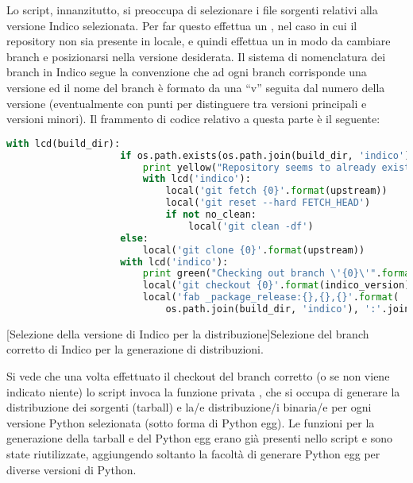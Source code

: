         Lo script, innanzitutto, si preoccupa di selezionare i file sorgenti relativi alla versione Indico selezionata. Per far questo effettua un , nel caso in cui il repository non sia presente in locale, e quindi effettua un  in modo da cambiare branch e posizionarsi nella versione desiderata. Il sistema di nomenclatura dei branch in Indico segue la convenzione che ad ogni branch corrisponde una versione ed il nome del branch è formato da una ``v'' seguita dal numero della versione (eventualmente con punti per distinguere tra versioni principali e versioni minori). Il frammento di codice relativo a questa parte è il seguente:
        
        \begin{center}
            \begin{lstlisting}[language=python, gobble=18]
                with lcd(build_dir):
                    if os.path.exists(os.path.join(build_dir, 'indico')):
                        print yellow("Repository seems to already exist.")
                        with lcd('indico'):
                            local('git fetch {0}'.format(upstream))
                            local('git reset --hard FETCH_HEAD')
                            if not no_clean:
                                local('git clean -df')
                    else:
                        local('git clone {0}'.format(upstream))
                    with lcd('indico'):
                        print green("Checking out branch \'{0}\'".format(indico_version))
                        local('git checkout {0}'.format(indico_version))
                        local('fab _package_release:{},{},{}'.format(
                            os.path.join(build_dir, 'indico'), ':'.join(py_versions), str(system_node).lower()))
            \end{lstlisting}
            \captionsetup{textformat=empty,labelformat=empty} \vspace{-2em}
            [Selezione della versione di Indico per la distribuzione]{Selezione del branch corretto di Indico per la generazione di distribuzioni.}
        \end{center}
        
        Si vede che una volta effettuato il checkout del branch corretto (o  se non viene indicato niente) lo script invoca la funzione privata , che si occupa di generare la distribuzione dei sorgenti (tarball) e la/e distribuzione/i binaria/e per ogni versione Python selezionata (sotto forma di Python egg). Le funzioni per la generazione della tarball e del Python egg erano già presenti nello script e sono state riutilizzate, aggiungendo soltanto la facoltà di generare Python egg per diverse versioni di Python.
        
